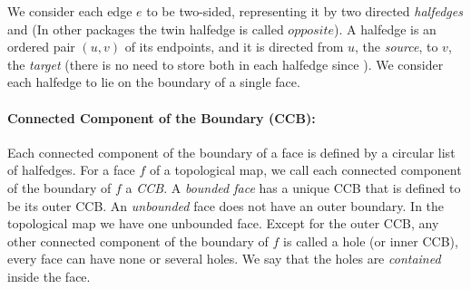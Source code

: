 We consider each edge $e$ to be two-sided, representing it by two
directed {\em halfedges}  and 
(In other packages the twin halfedge is called $opposite$).  
A halfedge  is an ordered pair $(u,v)$ of its endpoints, and
it is directed from $u$, the {\em source}, to $v$, the {\em target} (there 
is no need to store both in each halfedge since 
%
).
We consider each halfedge to lie on the boundary of a single face.



\paragraph{Connected Component of the Boundary (CCB):}
Each connected component of the boundary of a face is %
defined by a
circular list of halfedges. 
For a face $f$ of a topological map, 
we call each
connected component of the boundary of $f$ a {\em CCB}.
A {\em bounded face} has a
unique CCB that is defined to be
its outer CCB. An
{\em unbounded\/} face does not have an outer boundary.
In the topological map we have one unbounded face.
Except for the outer CCB, any other
connected component of the boundary of $f$ is called a hole (or inner CCB),
every face can have none
or several holes.
We say that the holes are {\em contained\/} inside
the face.

